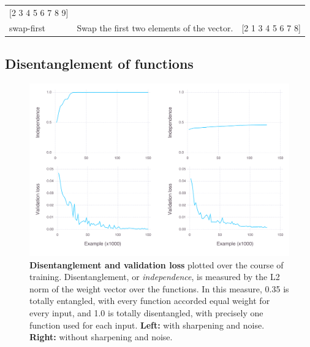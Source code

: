 \documentclass[12pt,twoside]{mitthesis}
\begin{document}
\begin{longtable}[c]{@{}lll@{}}
\begin{minipage}[t]{0.22\columnwidth}
{[}2 3 4 5 6 7 8 9{]}
\strut\end{minipage}\tabularnewline
\begin{minipage}[t]{0.14\columnwidth}\raggedright\strut
swap-first
\strut\end{minipage} &
\begin{minipage}[t]{0.55\columnwidth}\raggedright\strut
Swap the first two elements of the vector.
\strut\end{minipage} &
\begin{minipage}[t]{0.22\columnwidth}\raggedright\strut
{[}2 1 3 4 5 6 7 8{]}
\strut\end{minipage}\tabularnewline
\bottomrule
\end{longtable}

\subsection{Disentanglement of
functions}\label{disentanglement-of-functions}

\begin{figure}[htbp]
\centering
\includegraphics{figures/combo-loss-entanglement.png}
\caption{\label{fig:loss_entanglement}\textbf{Disentanglement and
validation loss} plotted over the course of training. Disentanglement,
or \emph{independence}, is measured by the L2 norm of the weight vector
over the functions. In this measure, 0.35 is totally entangled, with
every function accorded equal weight for every input, and 1.0 is totally
disentangled, with precisely one function used for each input.
\textbf{Left:} with sharpening and noise. \textbf{Right:} without
sharpening and noise.}
\end{figure}
\end{document}
